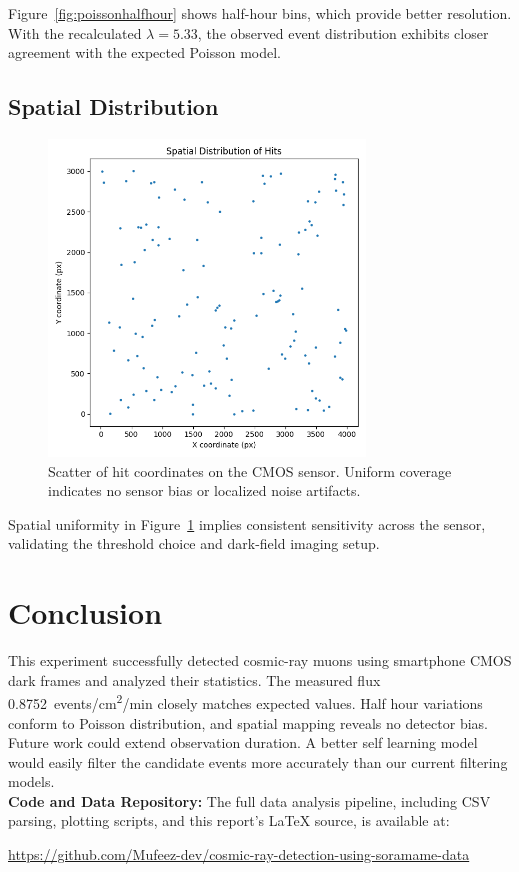 \documentclass[12pt]{article}
\begin{document}
	
	Figure~\ref{fig:poissonhalfhour} shows half-hour bins, which provide better resolution. With the recalculated $\lambda = 5.33$, the observed event distribution exhibits closer agreement with the expected Poisson model.
	
	
	
	\subsection{Spatial Distribution}
	\begin{figure}[H]
		\centering
		\includegraphics[width=0.75\textwidth]{../Data and notebooks/figures/spatial_distribution.png}
		\caption{Scatter of hit coordinates on the CMOS sensor. Uniform coverage indicates no sensor bias or localized noise artifacts.}
		\label{fig:spatial}
	\end{figure}
	
	Spatial uniformity in Figure~\ref{fig:spatial} implies consistent sensitivity across the sensor, validating the threshold choice and dark-field imaging setup.
	
	\section{Conclusion}
	This experiment successfully detected cosmic-ray muons using smartphone CMOS dark frames and analyzed their statistics. The measured flux \SI{0.8752}{events/cm^2/min} closely matches expected values. Half hour variations conform to Poisson distribution, and spatial mapping reveals no detector bias. Future work could extend observation duration. A better self learning model would easily filter the candidate events more accurately than our current filtering models.
	\\
	\noindent\textbf{Code and Data Repository:} The full data analysis pipeline, including CSV parsing, plotting scripts, and this report's LaTeX source, is available at:
	
	\url{https://github.com/Mufeez-dev/cosmic-ray-detection-using-soramame-data}
	
	
	
	
\end{document}
